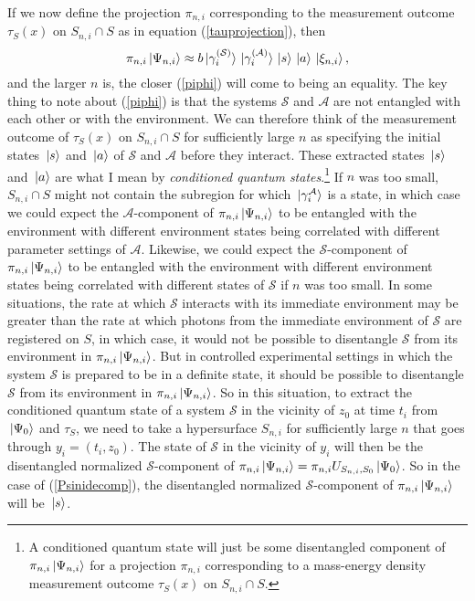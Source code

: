 If we now define the projection $\pi_{n,i}$ corresponding to the measurement outcome  $\tau_S(x)$ on $S_{n,i}\cap S$ as in equation (\ref{tauprojection}), then
\begin{equation}\label{piphi}
	\pi_{n,i}\ket*{\Psi_{n,i}}\approx b\ket*{\gamma_i^{(\mathcal{S})}}\ket*{\gamma_i^{(\mathcal{A})}}\ket*{s}\ket*{a}\ket*{\xi_{n,i}},
\end{equation}
and the larger $n$ is, the closer (\ref{piphi}) will come to being an equality. The key thing to note about (\ref{piphi}) is that the systems $\mathcal{S}$ and $\mathcal{A}$ are not entangled with each other or with the environment.  We can therefore think of the measurement outcome of $\tau_S(x)$ on $S_{n,i}\cap S$ for sufficiently large $n$ as specifying the initial states $\ket*{s}$ and $\ket*{a}$ of   $\mathcal{S}$ and $\mathcal{A}$ before they interact. These extracted states $\ket*{s}$ and $\ket*{a}$ are what I mean by \emph{conditioned quantum states}.\footnote{A conditioned quantum state will just be some disentangled component of $\pi_{n,i}\ket*{\Psi_{n,i}}$ for a projection $\pi_{n,i}$ corresponding to a mass-energy density measurement outcome $\tau_S(x)$ on $S_{n,i}\cap S$.} If $n$ was too small, $S_{n,i}\cap S$ might not contain the subregion for which $\ket*{\gamma_i^{\mathcal{A}}}$ is a state, in which case we could expect the $\mathcal{A}$-component of $\pi_{n,i}\ket*{\Psi_{n,i}}$ to be entangled with the environment with different environment states being correlated with different parameter settings of $\mathcal{A}$. Likewise, we could expect the $\mathcal{S}$-component of $\pi_{n,i}\ket*{\Psi_{n,i}}$ to be entangled with  the environment with different environment states being correlated with different states of $\mathcal{S}$ if $n$ was too small. In some situations, the rate at which $\mathcal{S}$ interacts with its immediate environment may be greater than the rate at which photons from the immediate environment of $\mathcal{S}$ are registered on $S$, in which case, it would not be possible to disentangle $\mathcal{S}$ from its environment in $\pi_{n,i}\ket*{\Psi_{n,i}}$. But in controlled experimental settings in which the system $\mathcal{S}$ is prepared to be in a definite state, it should be possible to disentangle $\mathcal{S}$ from its environment in $\pi_{n,i}\ket*{\Psi_{n,i}}$. So in this situation, to extract the conditioned quantum state of a system $\mathcal{S}$ in the vicinity of $z_0$ at time $t_i$ from $\ket*{\Psi_0}$ and $\tau_S$, we need to take a hypersurface $S_{n,i}$ for sufficiently large $n$ that goes through $y_i=(t_i, z_0)$. The state of $\mathcal{S}$ in the vicinity of $y_i$ will then be the disentangled normalized $\mathcal{S}$-component of $\pi_{n,i}\ket*{\Psi_{n,i}}=\pi_{n,i}U_{S_{n,i},S_0}\ket*{\Psi_0}$. So in the case of (\ref{Psinidecomp}), the disentangled normalized $\mathcal{S}$-component of $\pi_{n,i}\ket*{\Psi_{n,i}}$ will be $\ket*{s}$.


